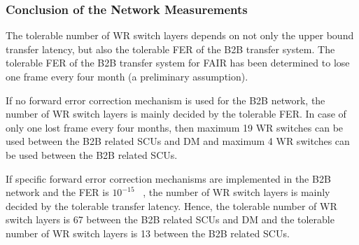 \subsubsection{Conclusion of the Network Measurements}
The tolerable number of WR switch layers depends on not only the upper bound transfer latency, but also the tolerable FER of the B2B transfer system. The tolerable FER of the B2B transfer system for FAIR has been determined to lose one frame every four month (a preliminary assumption). 

If no forward error correction mechanism is used for the B2B network, the number of WR switch layers is mainly decided by the tolerable FER. In case of only one lost frame every four months, then maximum 19 WR switches can be used between the B2B related SCUs and DM and maximum 4 WR switches can be used between the B2B related SCUs.


If specific forward error correction mechanisms are implemented in the B2B network and the FER is $10^{-15}$ ~\cite{prados_white_2011}, the number of WR switch layers is mainly decided by the tolerable transfer latency. Hence, the tolerable number of WR switch layers is 67 between the B2B related \gls{SCU}s and DM and the tolerable number of WR switch layers is 13 between the B2B related \gls{SCU}s.    

